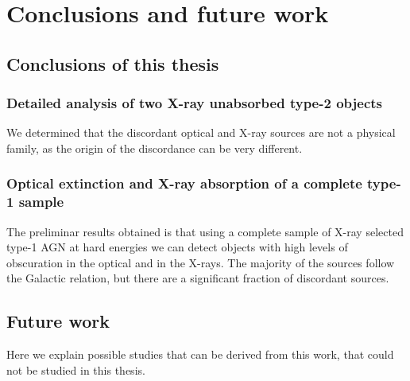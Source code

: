 
\chapter{Conclusions and future work} %
\label{conc}


\section{Conclusions of this thesis}

\subsection{Detailed analysis of two X-ray unabsorbed type-2 objects}

We determined that the discordant optical and X-ray sources are not a physical family, as the origin of the discordance can be very different.

\subsection{Optical extinction and X-ray absorption of a complete type-1 sample}

The preliminar results obtained is that using a complete sample of X-ray selected type-1 AGN at hard energies we can detect objects with high levels of obscuration in the optical and in the X-rays. The majority of the sources follow the Galactic relation, but there are a significant fraction of discordant sources.


\section{Future work}

Here we explain possible studies that can be derived from this work, that could not be studied in this thesis.




